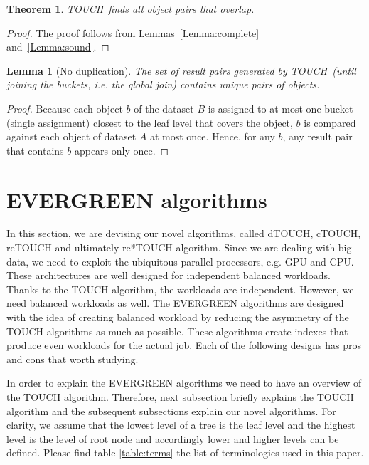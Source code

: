 \documentclass{vldb}
\newtheorem{theorem}{Theorem}
\newtheorem{lemma}{Lemma}
\newcommand{\SJ}{TOUCH}
\newcommand{\newSJ}{EVERGREEN}
\newcommand{\dSJ}{dTOUCH}
\newcommand{\cSJ}{cTOUCH}
\newcommand{\reSJ}{reTOUCH}
\newcommand{\rereSJ}{re*TOUCH}
\begin{document}
{\vspace{-2mm}
\begin{theorem}\label{Theorem:correct}
\SJ~finds all object pairs that overlap.
\end{theorem}
\vspace{-2mm}
\begin{proof}
The proof follows from Lemmas~\ref{Lemma:complete} and~\ref{Lemma:sound}.
\end{proof}
\vspace{-2mm}
\begin{lemma}[No duplication]\label{Lemma:NoDup}
The set of result pairs generated by \SJ~(until joining the buckets, i.e. the global join) contains unique pairs of objects.
\end{lemma}
\vspace{-2mm}
\begin{proof}
Because each object $b$ of the dataset $B$ is assigned to at most one bucket (single assignment) closest to the leaf level that covers the
object, $b$ is compared against each object of dataset $A$ at most once. Hence, for any $b$, any result pair that contains $b$ appears only once.
\end{proof}
}

\section{{\newSJ} algorithms}
\label{s_retouch}

In this section, we are devising our novel algorithms, called {\dSJ}, {\cSJ}, {\reSJ} and ultimately {\rereSJ} algorithm. Since we are dealing with big data, we need to exploit the ubiquitous parallel processors, e.g. GPU and CPU. These architectures are well designed for independent balanced workloads. Thanks to the {\SJ} algorithm, the workloads are independent. However, we need balanced workloads as well. The {\newSJ} algorithms are designed with the idea of creating balanced workload by reducing the asymmetry of the {\SJ} algorithms as much as possible. These algorithms create indexes that produce even workloads for the actual job. Each of the following designs has pros and cons that worth studying.

In order to explain the {\newSJ} algorithms we need to have an overview of the {\SJ} algorithm. Therefore, next subsection briefly explains the {\SJ} algorithm and the subsequent subsections explain our novel algorithms. For clarity, we assume that the lowest level of a tree is the leaf level and the highest level is the level of root node and accordingly lower and higher levels can be defined. Please find table \ref{table:terms} the list of terminologies used in this paper.
\end{document}
